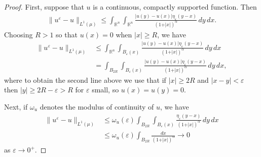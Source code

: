 \documentclass[a4paper,12pt,reqno]{amsart}
\numberwithin{equation}{section}
\theoremstyle{definition}
\theoremstyle{notation}
\newcommand{\R}{\mathds{R}}
\begin{document}
\begin{proof}
    First, suppose that \(u\) is a continuous, compactly supported function. Then \begin{align*}
      \| u^\varepsilon-u\|_{L^1(\mu)} \leq \int_{\R^n} \int_{\R^n} \frac{\vert u(y)-u(x) \vert \eta_\varepsilon (y-x)}{(1+\vert x \vert)^\alpha}  \,d y \,d x. 
    \end{align*} Choosing \(R>1\) so that \(u(x)=0\) when \(\vert x \vert \geq R\), we have \begin{align*}
       \| u^\varepsilon-u\|_{L^1(\mu)} &\leq \int_{\R^n} \int_{B_{\varepsilon}(x)} \frac{\vert u(y)-u(x) \vert \eta_\varepsilon (y-x)}{(1+\vert x \vert)^\alpha}  \,d y \,d x\\
       &= \int_{B_{2R}} \int_{B_{\varepsilon}(x)} \frac{\vert u(y)-u(x) \vert \eta_\varepsilon (y-x)}{(1+\vert x \vert)^\alpha}  \,d y \,d x,
    \end{align*} where to obtain the second line above we use that if \(\vert x \vert \geq 2R\) and \(\vert x-y\vert < \varepsilon\) then \(\vert y \vert \geq 2 R - \varepsilon > R\) for \(\varepsilon\) small, so \(u(x)=u(y)=0\). 
    
    Next, if \(\omega_u\) denotes the modulus of continuity of \(u\), we have \begin{align*}
          \| u^\varepsilon-u\|_{L^1(\mu)} &\leq \omega_u(\varepsilon) \int_{B_{2R}} \int_{B_{\varepsilon}(x)} \frac{\eta_\varepsilon (y-x)}{(1+\vert x \vert)^\alpha}  \,d y \,d x \\
          &\leq  \omega_u(\varepsilon) \int_{B_{2R}}  \frac{d x }{(1+\vert x \vert)^\alpha}\to 0
    \end{align*} as \(\varepsilon \to 0^+\). 



\end{proof}
\end{document}
